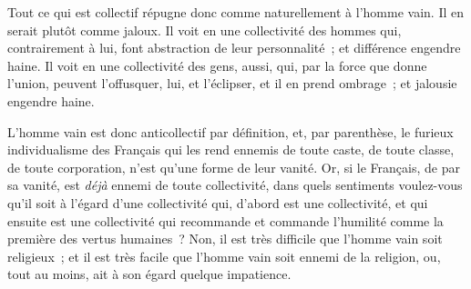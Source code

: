 \documentclass[french,twoside]{book} %
\newcommand{\astertri}{\medskip\par\centerline{\color{rubric}\large\selectfont{\syms ✻\,✻\,✻}}\medskip\par}%
\begin{document}
Tout ce qui est collectif répugne donc comme naturellement à l’homme vain. Il en serait plutôt comme jaloux. Il voit en une collectivité des hommes qui, contrairement à lui, font abstraction de leur personnalité ; et différence engendre haine. Il voit en une collectivité des gens, aussi, qui, par la  force que donne l’union, peuvent l’offusquer, lui, et l’éclipser, et il en prend ombrage ; et jalousie engendre haine.\par
L’homme vain est donc anticollectif par définition, et, par parenthèse, le furieux individualisme des Français qui les rend ennemis de toute caste, de toute classe, de toute corporation, n’est qu’une forme de leur vanité. Or, si le Français, de par sa vanité, est {\itshape déjà} ennemi de toute collectivité, dans quels sentiments voulez-vous qu’il soit à l’égard d’une collectivité qui, d’abord est une collectivité, et qui ensuite est une collectivité qui recommande et commande l’humilité comme la première des vertus humaines ? Non, il est très difficile que l’homme vain soit religieux ; et il est très facile que l’homme vain soit ennemi de la religion, ou, tout au moins, ait à son égard quelque impatience.\par

\astertri
\end{document}
